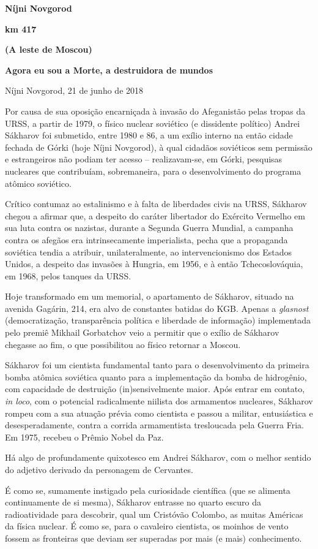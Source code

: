 \textbf{Níjni Novgorod}

\textbf{km 417 }

\textbf{(A leste de Moscou)}

\textbf{Agora eu sou a Morte, a destruidora de mundos}

Níjni Novgorod, 21 de junho de 2018

Por causa de sua oposição encarniçada à invasão do Afeganistão pelas
tropas da URSS, a partir de 1979, o físico nuclear soviético (e
dissidente político) Andrei Sákharov foi submetido, entre 1980 e 86, a
um exílio interno na então cidade fechada de Górki (hoje Níjni
Novgorod), à qual cidadãos soviéticos sem permissão e estrangeiros não
podiam ter acesso -- realizavam-se, em Górki, pesquisas nucleares que
contribuíam, sobremaneira, para o desenvolvimento do programa atômico
soviético.

Crítico contumaz ao estalinismo e à falta de liberdades civis na URSS,
Sákharov chegou a afirmar que, a despeito do caráter libertador do
Exército Vermelho em sua luta contra os nazistas, durante a Segunda
Guerra Mundial, a campanha contra os afegãos era intrinsecamente
imperialista, pecha que a propaganda soviética tendia a atribuir,
unilateralmente, ao intervencionismo dos Estados Unidos, a despeito das
invasões à Hungria, em 1956, e à então Tchecoslováquia, em 1968, pelos
tanques da URSS.

Hoje transformado em um memorial, o apartamento de Sákharov, situado na
avenida Gagárin, 214, era alvo de constantes batidas do KGB. Apenas a
\emph{glasnost} (democratização, transparência política e liberdade de
informação) implementada pelo premiê Mikhail Gorbatchov veio a permitir
que o exílio de Sákharov chegasse ao fim, o que possibilitou ao físico
retornar a Moscou.

Sákharov foi um cientista fundamental tanto para o desenvolvimento da
primeira bomba atômica soviética quanto para a implementação da bomba de
hidrogênio, com capacidade de destruição (in)sensivelmente maior. Após
entrar em contato, \emph{in loco}, com o potencial radicalmente niilista
dos armamentos nucleares, Sákharov rompeu com a sua atuação prévia como
cientista e passou a militar, entusiástica e desesperadamente, contra a
corrida armamentista tresloucada pela Guerra Fria. Em 1975, recebeu o
Prêmio Nobel da Paz.

Há algo de profundamente quixotesco em Andrei Sákharov, com o melhor
sentido do adjetivo derivado da personagem de Cervantes.

É como se, sumamente instigado pela curiosidade científica (que se
alimenta continuamente de si mesma), Sákharov entrasse no quarto escuro
da radioatividade para descobrir, qual um Cristóvão Colombo, as muitas
Américas da física nuclear. É como se, para o cavaleiro cientista, os
moinhos de vento fossem as fronteiras que deviam ser superadas por mais
(e mais) conhecimento.

